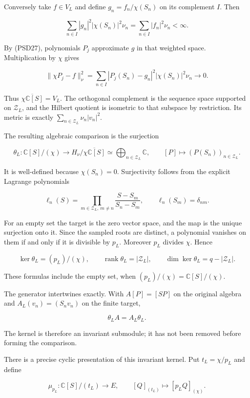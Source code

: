 Conversely take \(f \in V_L\) and define \(g_n=f_n/\chi(S_n)\) on its complement \(I\). Then

\[
\sum_{n\in I}|g_n|^2|\chi(S_n)|^2\nu_n
=\sum_{n\in I}|f_n|^2\nu_n<\infty.
\]

By (PSD27), polynomials \(P_j\) approximate \(g\) in that weighted space. Multiplication by \(\chi\) gives

\[
\|\chi P_j-f\|_\nu^2
=\sum_{n\in I}|P_j(S_n)-g_n|^2|\chi(S_n)|^2\nu_n\longrightarrow0.
\tag{PSD29}
\]

Thus \(\overline{\chi\mathbb C[S]}=V_L\). The orthogonal complement is the sequence space supported on \(\mathcal Z_L\), and the Hilbert quotient is isometric to that subspace by restriction. Its metric is exactly \(\sum_{n\in\mathcal Z_L}\nu_n|v_n|^2\).

The resulting algebraic comparison is the surjection

\[
\theta_L:\mathbb C[S]/(\chi)\longrightarrow
H_\nu/\overline{\chi\mathbb C[S]}
\simeq\bigoplus_{n\in\mathcal Z_L}\mathbb C,
\qquad [P]\longmapsto(P(S_n))_{n\in\mathcal Z_L}.
\tag{PSD30}
\]

It is well-defined because \(\chi(S_n)=0\). Surjectivity follows from the explicit Lagrange polynomials

\[
\ell_n(S)=\prod_{m\in\mathcal Z_L,\ m\ne n}\frac{S-S_m}{S_n-S_m},
\qquad \ell_n(S_m)=\delta_{nm}.
\tag{PSD31}
\]

For an empty set the target is the zero vector space, and the map is the unique surjection onto it. Since the sampled roots are distinct, a polynomial vanishes on them if and only if it is divisible by \(p_L\). Moreover \(p_L\) divides \(\chi\). Hence

\[
\ker\theta_L=(p_L)/(\chi),\qquad
\operatorname{rank}\theta_L=|\mathcal Z_L|,\qquad
\dim\ker\theta_L=q-|\mathcal Z_L|.
\tag{PSD32}
\]

These formulas include the empty set, when \((p_L)/(\chi)=\mathbb C[S]/(\chi)\).

The generator intertwines exactly. With \(A[P]=[SP]\) on the original algebra and \(A_L(v_n)=(S_nv_n)\) on the finite target,

\[
\theta_LA=A_L\theta_L.
\tag{PSD33}
\]

The kernel is therefore an invariant submodule; it has not been removed before forming the comparison.

There is a precise cyclic presentation of this invariant kernel. Put \(t_L=\chi/p_L\) and define

\[
\mu_{p_L}:\mathbb C[S]/(t_L)\longrightarrow E,
\qquad [Q]_{(t_L)}\longmapsto[p_LQ]_{(\chi)}.
\tag{PSD33a}
\]


